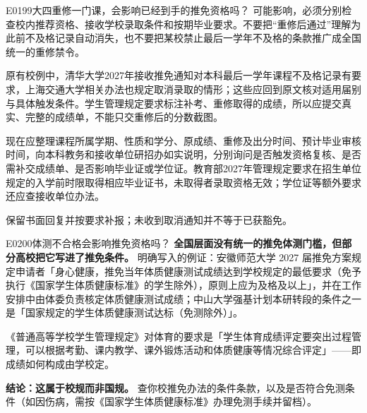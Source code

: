 \begin{qa}{E0199}{大四重修一门课，会影响已经到手的推免资格吗？}
可能影响，必须分别检查校内推荐资格、接收学校录取条件和按期毕业要求。不要把“重修后通过”理解为此前不及格记录自动消失，也不要把某校禁止最后一学年不及格的条款推广成全国统一的重修禁令。  

原有校例中，清华大学2027年接收推免通知对本科最后一学年课程不及格记录有要求，上海交通大学相关办法也规定取消录取的情形；这些应回到原文核对适用届别与具体触发条件。学生管理规定要求标注补考、重修取得的成绩，所以应提交真实、完整的成绩单，不能只交重修后的分数截图。   

现在应整理课程所属学期、性质和学分、原成绩、重修及出分时间、预计毕业审核时间，向本科教务和接收单位研招办如实说明，分别询问是否触发资格复核、是否需补交成绩单、是否影响毕业证或学位证。教育部2027年管理规定要求在招生单位规定的入学前时限取得相应毕业证书，未取得者录取资格无效；学位证等额外要求还应查接收单位办法。

保留书面回复并按要求补报；未收到取消通知并不等于已获豁免。
\end{qa}

\begin{qa}{E0200}{体测不合格会影响推免资格吗？}
\textbf{全国层面没有统一的推免体测门槛，但部分高校把它写进了推免条件。}
明确写入的例证：安徽师范大学 2027 届推免方案规定申请者「身心健康，推免当年体质健康测试成绩达到学校规定的最低要求（免予执行《国家学生体质健康标准》的学生除外），原则上应为及格及以上」，并在工作安排中由体委负责核定体质健康测试成绩；中山大学强基计划本研转段的条件之一是「国家规定的学生体质健康测试达标（免测除外）」。

《普通高等学校学生管理规定》对体育的要求是「学生体育成绩评定要突出过程管理，可以根据考勤、课内教学、课外锻炼活动和体质健康等情况综合评定」——即成绩如何构成由学校定。

\textbf{结论：这属于校规而非国规。} 查你校推免办法的条件条款，以及是否符合免测条件（如因伤病，需按《国家学生体质健康标准》办理免测手续并留档）。
\end{qa}


